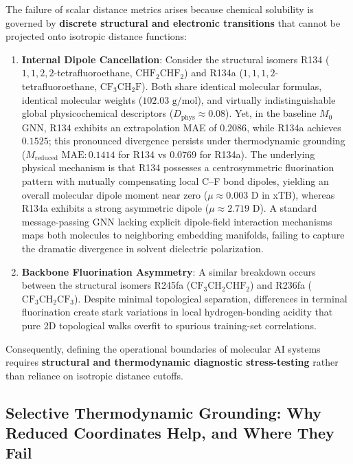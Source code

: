 The failure of scalar distance metrics arises because chemical solubility is governed by \textbf{discrete structural and electronic transitions} that cannot be projected onto isotropic distance functions:
\begin{enumerate}
    \item \textbf{Internal Dipole Cancellation}: Consider the structural isomers R134 ($1,1,2,2$-tetrafluoroethane, $\text{CHF}_2\text{CHF}_2$) and R134a ($1,1,1,2$-tetrafluoroethane, $\text{CF}_3\text{CH}_2\text{F}$). Both share identical molecular formulas, identical molecular weights ($102.03\text{ g/mol}$), and virtually indistinguishable global physicochemical descriptors ($D_{\mathrm{phys}} \approx 0.08$). Yet, in the baseline $M_0$ GNN, R134 exhibits an extrapolation MAE of $0.2086$, while R134a achieves $0.1525$; this pronounced divergence persists under thermodynamic grounding ($M_{\mathrm{reduced}}\text{ MAE}: 0.1414$ for R134 vs $0.0769$ for R134a). The underlying physical mechanism is that R134 possesses a centrosymmetric fluorination pattern with mutually compensating local C--F bond dipoles, yielding an overall molecular dipole moment near zero ($\mu \approx 0.003\text{ D}$ in xTB), whereas R134a exhibits a strong asymmetric dipole ($\mu \approx 2.719\text{ D}$). A standard message-passing GNN lacking explicit dipole-field interaction mechanisms maps both molecules to neighboring embedding manifolds, failing to capture the dramatic divergence in solvent dielectric polarization.
    \item \textbf{Backbone Fluorination Asymmetry}: A similar breakdown occurs between the structural isomers R245fa ($\text{CF}_3\text{CH}_2\text{CHF}_2$) and R236fa ($\text{CF}_3\text{CH}_2\text{CF}_3$). Despite minimal topological separation, differences in terminal fluorination create stark variations in local hydrogen-bonding acidity that pure 2D topological walks overfit to spurious training-set correlations.
\end{enumerate}

Consequently, defining the operational boundaries of molecular AI systems requires \textbf{structural and thermodynamic diagnostic stress-testing} rather than reliance on isotropic distance cutoffs.

\subsection{Selective Thermodynamic Grounding: Why Reduced Coordinates Help, and Where They Fail}
\label{subsec:selective_grounding}

